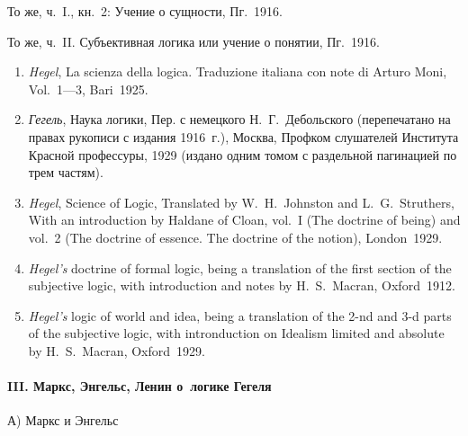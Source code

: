 То же, ч.~I., кн.~2: Учение о сущности, Пг.~1916.

То же, ч.~II. Субъективная логика или учение о понятии, Пг.~1916.

\begin{enumerate}
\item
{\em Hegel}, La scienza della logica. Traduzione italiana con note di
Arturo Moni, Vol.~1---3, Bari~1925.

\item
{\em Гегель}, Наука логики, Пер. с немецкого Н.~Г.~Дебольского
(перепечатано на правах рукописи с издания 1916~г.), Москва, Профком
слушателей Института Красной профессуры, 1929 (издано одним томом с
раздельной пагинацией по трем частям).

\item
{\em Hegel}, Science of Logic, Translated by W.~H.~Johnston and
L.~G.~Struthers, With an intro\-duction by Haldane of Cloan, vol.~I
(The doctrine of being) and vol.~2 (The doctrine of essence. The doctrine of
the notion), London~1929.

\item{\em Hegel's} doctrine of formal logic, being a translation of the first
section of the subjective logic, with intro\-duction and notes by
H.~S.~Macran, Oxford~1912.

\item{\em Hegel's} logic of world and idea, being a translation of the 2-nd and
3-d parts of the subjective logic, with intro\-nduction on Idealism limited and
absolute by H.~S.~Macran, Oxford~1929.
\end{enumerate}

\paragraph%
[III. Маркс, Энгельс, Ленин о~логике Гегеля]%
{III. Маркс, Энгельс, Ленин о~логике Гегеля}

{\centering А) Маркс и Энгельс \par}

